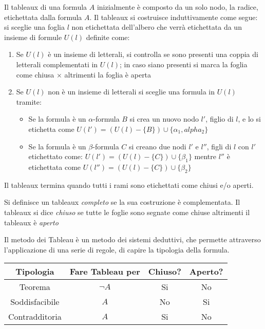 Il tableaux di una formula $A$ inizialmente è composto da un solo nodo, la radice, etichettata
dalla formula $A$.
Il tableaux si costruisce induttivamente come segue:
si sceglie una foglia $l$ non etichettata dell'albero che verrà etichettata da un
insieme di formule $U(l)$ definite come:
\begin{enumerate}
  \item Se $U(l)$ è un insieme di letterali, si controlla se sono presenti una coppia
        di letterali complementati in $U(l)$;
        in caso siano presenti si marca la foglia come chiusa $\times$ altrimenti la foglia è aperta
  \item Se $U(l)$ non è un insieme di letterali si sceglie una formula in $U(l)$ tramite:
        \begin{itemize}
          \item Se la formula è un $\alpha$-formula $B$ si crea un nuovo nodo $l'$,
                figlio di $l$, e lo si etichetta come $U(l') = (U(l) - \{B\}) \cup \{\alpha_1,alpha_2\}$
          \item Se la formula è un $\beta$-formula $C$ si creano due nodi $l'$ e $l''$,
                figli di $l$ con $l'$ etichettato come: $U(l') = (U(l) - \{C\}) \cup \{\beta_1\}$
                mentre $l''$ è etichettata come $U(l'') = (U(l) - \{C\}) \cup \{\beta_2\}$
        \end{itemize}
\end{enumerate}
Il tableaux termina quando tutti i rami sono etichettati come chiusi e/o aperti.

\begin{defi}
Si definisce un tableaux \emph{completo} se la sua costruzione è complementata.
Il tableaux si dice \emph{chiuso} se tutte le foglie sono segnate come chiuse
altrimenti il tableaux è \emph{aperto}
\end{defi}

Il metodo dei Tableau è un metodo dei sistemi deduttivi, che permette attraverso
l'applicazione di una serie di regole, di capire la tipologia della formula.
\begin{tabular}{cccc}
\toprule Tipologia & Fare Tableau per & Chiuso? & Aperto? \\
\midrule
         Teorema & $\neg A$ & Si & No \\
         Soddisfacibile & $A$ & No & Si \\
         Contradditoria & $A$ & Si & No \\
\bottomrule
\end{tabular}


